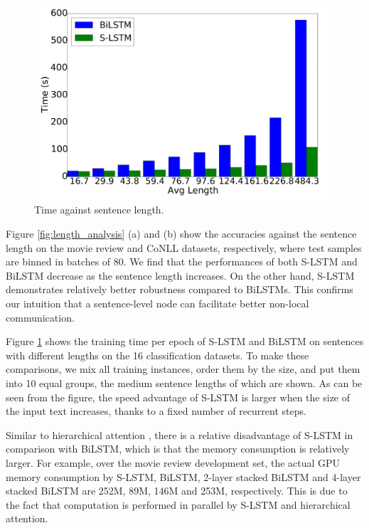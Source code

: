 \documentclass[11pt,a4paper]{article}
\begin{document}
\begin{figure}[t]
\begin{center}
\includegraphics[width=0.9\linewidth]{length_time.pdf}
\end{center}
\vspace{-1.5em}
\caption{\label{fig:length_time}Time against sentence length.}
\end{figure}


Figure \ref{fig:length_analysis} (a) and (b) show the accuracies against the sentence length on the movie review and CoNLL datasets, respectively, where test samples are binned in batches of 80. 
We find that the performances of both S-LSTM and BiLSTM decrease as the sentence length increases. 
On the other hand, S-LSTM demonstrates relatively better robustness compared to BiLSTMs.
This confirms our intuition that a sentence-level node can facilitate better non-local communication.


Figure \ref{fig:length_time} shows the training time per epoch of S-LSTM and BiLSTM on sentences with different lengths on the 16 classification datasets. 
To make these comparisons, we mix all training instances, order them by the size, and put them into 10 equal groups, the medium sentence lengths of which are shown.
As can be seen from the figure, the speed advantage of S-LSTM is larger when the size of the input text increases, thanks to a fixed number of recurrent steps. 

Similar to hierarchical attention \citep{vaswani2017attention}, there is a relative disadvantage of S-LSTM in comparison with BiLSTM, which is that the memory consumption is relatively larger.
For example, over the movie review development set, the actual GPU memory consumption by S-LSTM, BiLSTM, 2-layer stacked BiLSTM and 4-layer stacked BiLSTM are 252M, 89M, 146M and 253M, respectively.
This is due to the fact that computation is performed in parallel by S-LSTM and hierarchical attention.
\end{document}
